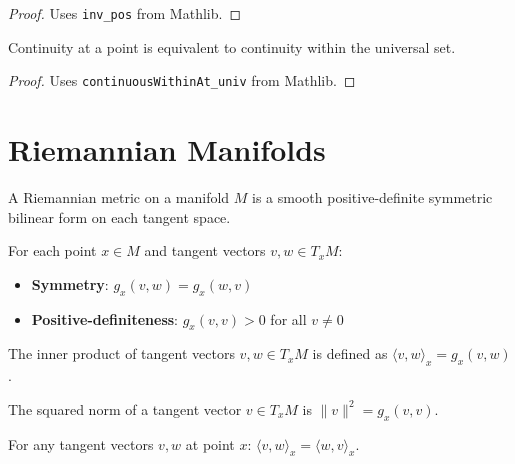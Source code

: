 \begin{proof}
\leanok
Uses \texttt{inv\_pos} from Mathlib.
\end{proof}

\begin{lemma}
\label{lem:continuousAt_iff}
\leanok
Continuity at a point is equivalent to continuity within the universal set.
\end{lemma}

\begin{proof}
\leanok
Uses \texttt{continuousWithinAt\_univ} from Mathlib.
\end{proof}

\chapter{Riemannian Manifolds}
\label{chap:riemannian}

\begin{definition}
\label{def:riemannian_metric}
\leanok
{}
A Riemannian metric on a manifold $M$ is a smooth positive-definite symmetric bilinear form on each tangent space.

For each point $x \in M$ and tangent vectors $v, w \in T_xM$:
\begin{itemize}
\item \textbf{Symmetry}: $g_x(v, w) = g_x(w, v)$
\item \textbf{Positive-definiteness}: $g_x(v, v) > 0$ for all $v \neq 0$
\end{itemize}
\end{definition}

\begin{definition}
\label{def:inner_product}
\leanok
{}
The inner product of tangent vectors $v, w \in T_xM$ is defined as $\langle v, w \rangle_x = g_x(v, w)$.
\end{definition}

\begin{definition}
\label{def:norm_sq}
\leanok
{}
The squared norm of a tangent vector $v \in T_xM$ is $\|v\|^2 = g_x(v, v)$.
\end{definition}

\begin{lemma}
\label{lem:inner_product_symm}
\leanok
{}
For any tangent vectors $v, w$ at point $x$: $\langle v, w \rangle_x = \langle w, v \rangle_x$.
\end{lemma}

